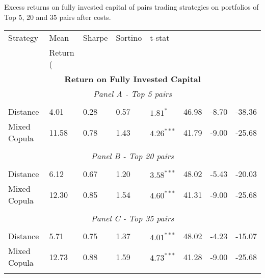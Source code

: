 \documentclass[a4paper]{article}
\begin{document}
	\begin{threeparttable}[H]
		\centering \tiny
		\caption{Excess returns on fully invested capital of pairs trading strategies on portfolios of Top 5, 20 and 35 pairs after costs. }
		\begin{tabularx}{\textwidth}{@{\extracolsep{\fill}}llllllll@{}}
			\toprule
			Strategy & Mean  & Sharpe & Sortino & t-stat & \\%
			& Return (\\%
			\midrule
			\multicolumn{8}{c}{\textbf{Return on Fully Invested Capital}} \\
			\multicolumn{8}{c}{\textit{Panel A - Top 5 pairs}} \\
			&       &       &       &       &       &       &  \\
			Distance & 4.01  & 0.28  & 0.57  & $1.81^{*}$  & 46.98 & -8.70    & -38.36  \\
			Mixed Copula & 11.58  & 0.78  & 1.43  & $4.26^{***}$  & 41.79 & -9.00  & -25.68 \\
			\multicolumn{1}{r}{} & \multicolumn{1}{r}{} & \multicolumn{1}{r}{} & \multicolumn{1}{r}{} & \multicolumn{1}{r}{} & \multicolumn{1}{r}{} & \multicolumn{1}{r}{} & \multicolumn{1}{r}{} \\
			\multicolumn{8}{c}{\textit{Panel B - Top 20 pairs}} \\
			&       &       &       &       &       &       &  \\
			Distance & 6.12  & 0.67  & 1.20  & $3.58^{***}$  & 48.02 & -5.43  & -20.03 \\
			Mixed Copula  & 12.30  & 0.85  & 1.54  & $4.60^{***}$  & 41.31 & -9.00  & -25.68  \\
			\multicolumn{1}{r}{} & \multicolumn{1}{r}{} & \multicolumn{1}{r}{} & \multicolumn{1}{r}{} & \multicolumn{1}{r}{} & \multicolumn{1}{r}{} & \multicolumn{1}{r}{} & \multicolumn{1}{r}{} \\
			\multicolumn{8}{c}{\textit{Panel C - Top 35 pairs}} \\
			&       &       &       &       &       &       &  \\
			Distance & 5.71  & 0.75  & 1.37  & $4.01^{***}$  & 48.02 & -4.23  & -15.07 \\
			Mixed Copula & 12.73  & 0.88  & 1.59  & $4.73^{***}$  & 41.28 & -9.00  & -25.68  \\
			\multicolumn{1}{r}{} & \multicolumn{1}{r}{} & \multicolumn{1}{r}{} & \multicolumn{1}{r}{} & \multicolumn{1}{r}{} & \multicolumn{1}{r}{} & \multicolumn{1}{r}{} & \multicolumn{1}{r}{} \\

\end{tabularx}
\end{threeparttable}
\end{document}
